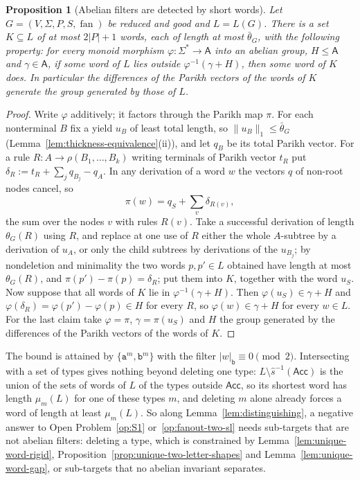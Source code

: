 \documentclass[11pt]{article}
\numberwithin{equation}{section}
\theoremstyle{plain}
\newtheorem{proposition}[theorem]{Proposition}
\theoremstyle{definition}
\theoremstyle{remark}
\newcommand{\fan}{\operatorname{fan}}
\theoremstyle{plain}
\begin{document}
\begin{proposition}[Abelian filters are detected by short words]
\label{prop:abelian-filter-short}
Let $G=(V,\Sigma,P,S,\fan)$ be reduced and good and $L=L(G)$.  There is a set
$K\subseteq L$ of at most $2|P|+1$ words, each of length at most $\bar\theta_G$, with
the following property: for every monoid morphism $\varphi:\Sigma^*\to\mathsf A$
into an abelian group, $H\le\mathsf A$ and $\gamma\in\mathsf A$, if some word of $L$
lies outside $\varphi^{-1}(\gamma+H)$, then some word of $K$ does.  In particular the
differences of the Parikh vectors of the words of $K$ generate the group generated
by those of $L$.
\end{proposition}

\begin{proof}
Write $\varphi$ additively; it factors through the Parikh map $\pi$.  For each
nonterminal $B$ fix a yield $u_B$ of least total length, so $\|u_B\|_1\le\bar\theta_G$
(Lemma~\ref{lem:thickness-equivalence}(ii)), and let $q_B$ be its total Parikh
vector.  For a rule $R:A\to\rho(B_1,\ldots,B_k)$ writing terminals of Parikh vector
$t_R$ put $\delta_R:=t_R+\sum_jq_{B_j}-q_A$.  In any derivation of a word $w$ the
vectors $q$ of non-root nodes cancel, so
\[
 \pi(w)=q_S+\sum_v\delta_{R(v)},
\]
the sum over the nodes $v$ with rules $R(v)$.  Take a successful derivation of
length $\theta_G(R)$ using $R$, and replace at one use of $R$ either the whole
$A$-subtree by a derivation of $u_A$, or only the child subtrees by derivations
of the $u_{B_j}$; by nondeletion and minimality the two words $p,p'\in L$ obtained
have length at most $\theta_G(R)$, and $\pi(p')-\pi(p)=\delta_R$; put them into $K$,
together with the word $u_S$.  Now suppose that all words of $K$ lie in
$\varphi^{-1}(\gamma+H)$.  Then $\varphi(u_S)\in\gamma+H$ and
$\varphi(\delta_R)=\varphi(p')-\varphi(p)\in H$ for every $R$, so
$\varphi(w)\in\gamma+H$ for every $w\in L$.  For the last claim take
$\varphi=\pi$, $\gamma=\pi(u_S)$ and $H$ the group generated by the differences
of the Parikh vectors of the words of $K$.
\end{proof}

The bound is attained by $\{\mathtt a^m,\mathtt b^m\}$ with the filter
$|w|_{\mathtt b}\equiv0\pmod2$.  Intersecting with a set of types gives nothing
beyond deleting one type: $L\setminus\widehat s^{-1}(\mathsf{Acc})$ is the union of
the sets of words of $L$ of the types outside $\mathsf{Acc}$, so its shortest word
has length $\mu_m(L)$ for one of these types $m$, and deleting $m$ alone already
forces a word of length at least $\mu_m(L)$.  So along Lemma~\ref{lem:distinguishing}, a negative
answer to Open Problem~\ref{op:S1} or~\ref{op:fanout-two-sl} needs sub-targets that are
not abelian filters: deleting a type, which is constrained by
Lemma~\ref{lem:unique-word-rigid}, Proposition~\ref{prop:unique-two-letter-shapes}
and Lemma~\ref{lem:unique-word-gap}, or sub-targets that no abelian invariant
separates.
\end{document}
